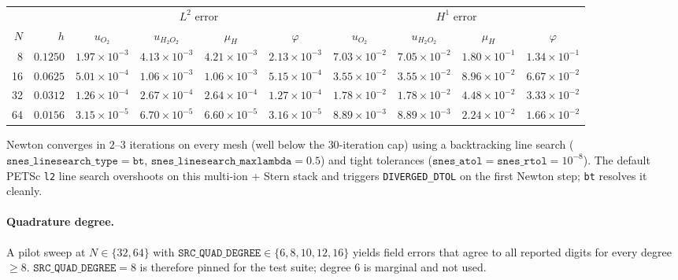 \documentclass[11pt]{article}
\begin{document}
\begin{center}
\footnotesize
\begin{tabular}{rr cccc cccc}
\toprule
& & \multicolumn{4}{c}{$L^2$ error} & \multicolumn{4}{c}{$H^1$ error} \\
\cmidrule(lr){3-6}\cmidrule(lr){7-10}
$N$ & $h$ & $u_{O_2}$ & $u_{H_2O_2}$ & $\mu_H$ & $\varphi$
      & $u_{O_2}$ & $u_{H_2O_2}$ & $\mu_H$ & $\varphi$ \\
\midrule
 8 & $0.1250$ & $1.97{\times}10^{-3}$ & $4.13{\times}10^{-3}$ & $4.21{\times}10^{-3}$ & $2.13{\times}10^{-3}$
              & $7.03{\times}10^{-2}$ & $7.05{\times}10^{-2}$ & $1.80{\times}10^{-1}$ & $1.34{\times}10^{-1}$ \\
16 & $0.0625$ & $5.01{\times}10^{-4}$ & $1.06{\times}10^{-3}$ & $1.06{\times}10^{-3}$ & $5.15{\times}10^{-4}$
              & $3.55{\times}10^{-2}$ & $3.55{\times}10^{-2}$ & $8.96{\times}10^{-2}$ & $6.67{\times}10^{-2}$ \\
32 & $0.0312$ & $1.26{\times}10^{-4}$ & $2.67{\times}10^{-4}$ & $2.64{\times}10^{-4}$ & $1.27{\times}10^{-4}$
              & $1.78{\times}10^{-2}$ & $1.78{\times}10^{-2}$ & $4.48{\times}10^{-2}$ & $3.33{\times}10^{-2}$ \\
64 & $0.0156$ & $3.15{\times}10^{-5}$ & $6.70{\times}10^{-5}$ & $6.60{\times}10^{-5}$ & $3.16{\times}10^{-5}$
              & $8.89{\times}10^{-3}$ & $8.89{\times}10^{-3}$ & $2.24{\times}10^{-2}$ & $1.66{\times}10^{-2}$ \\
\bottomrule
\end{tabular}
\end{center}

Newton converges in $2$--$3$ iterations on every mesh
(well below the $30$-iteration cap) using a backtracking line search
($\mathtt{snes\_linesearch\_type} = \mathtt{bt}$,
$\mathtt{snes\_linesearch\_maxlambda} = 0.5$) and tight tolerances
($\mathtt{snes\_atol} = \mathtt{snes\_rtol} = 10^{-8}$). The default
PETSc \texttt{l2} line search overshoots on this multi-ion + Stern
stack and triggers \texttt{DIVERGED\_DTOL} on the first Newton step;
\texttt{bt} resolves it cleanly.

\paragraph{Quadrature degree.} A pilot sweep at $N \in \{32, 64\}$ with
$\mathtt{SRC\_QUAD\_DEGREE} \in \{6, 8, 10, 12, 16\}$ yields field
errors that agree to all reported digits for every degree $\geq 8$.
$\mathtt{SRC\_QUAD\_DEGREE} = 8$ is therefore pinned for the test
suite; degree $6$ is marginal and not used.
\end{document}
